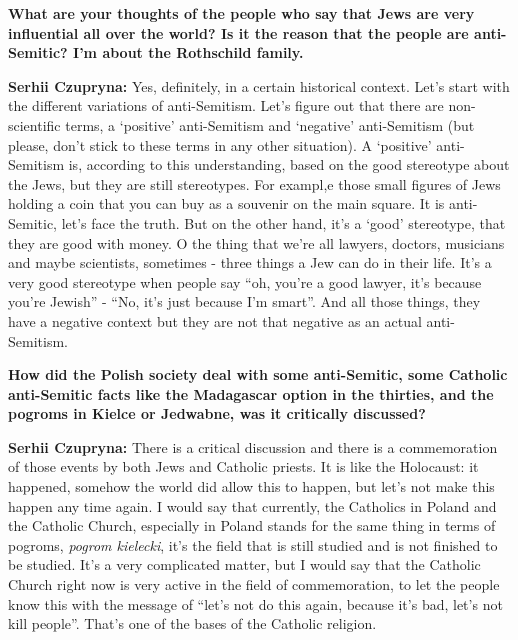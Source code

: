 \textbf{What are your thoughts of the people who say that Jews are very influential all over the world? Is it the reason that the people are anti-Semitic? I’m about the Rothschild family.}\par
\textbf{Serhii Czupryna:} Yes, definitely, in a certain historical context. Let’s start with the different variations of anti-Semitism. Let’s figure out that there are non-scientific terms, a ‘positive’ anti-Semitism and ‘negative’ anti-Semitism (but please, don’t stick to these terms in any other situation). A ‘positive’ anti-Semitism is, according to this understanding, based on the good stereotype about the Jews, but they are still stereotypes. For exampl,e those small figures of Jews holding a coin that you can buy as a souvenir on the main square. It is anti-Semitic, let’s face the truth. But on the other hand, it’s a ‘good’ stereotype, that they are good with money. O the thing that we’re all lawyers, doctors, musicians and maybe scientists, sometimes - three things a Jew can do in their life. It’s a very good stereotype when people say ``oh, you’re a good lawyer, it’s because you’re Jewish'' - ``No, it’s just because I’m smart''. And all those things, they have a negative context but they are not that negative as an actual anti-Semitism.\par
\textbf{How did the Polish society deal with some anti-Semitic, some Catholic anti-Semitic facts like the Madagascar option in the thirties, and the pogroms in Kielce or Jedwabne, was it critically discussed?}\par  
\textbf{Serhii Czupryna:} There is a critical discussion and there is a commemoration of those events by both Jews and Catholic priests. It is like the Holocaust: it happened, somehow the world did allow this to happen, but let’s not make this happen any time again. I would say that currently, the Catholics in Poland and the Catholic Church, especially in Poland stands for the same thing in terms of pogroms, \textit{pogrom kielecki}, it’s the field that is still studied and is not finished to be studied. It’s a very complicated matter, but I would say that the Catholic Church right now is very active in the field of commemoration, to let the people know this with the message of ``let’s not do this again, because it’s bad, let’s not kill people''. That’s one of the bases of the Catholic religion.